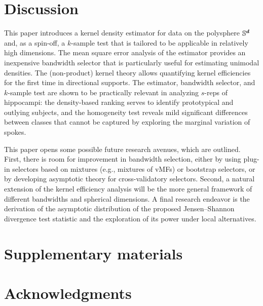 \documentclass[oneside,11pt]{article}
\begin{document}
\section{Discussion}
\label{sec:dis}

%
This paper introduces a kernel density estimator for data on the polysphere $\mathbb{S}^{\boldsymbol{d}}$ and, as a spin-off, a $k$-sample test that is tailored to be applicable in relatively high dimensions. The mean square error analysis of the estimator provides an inexpensive bandwidth selector that is particularly useful for estimating unimodal densities. The (non-product) kernel theory allows quantifying kernel efficiencies for the first time in directional supports. The estimator, bandwidth selector, and $k$-sample test are shown to be practically relevant in analyzing $s$-reps of hippocampi: the density-based ranking serves to identify prototypical and outlying subjects, and the homogeneity test reveals mild significant differences between classes that cannot be captured by exploring the marginal variation of spokes.

%
This paper opens some possible future research avenues, which are outlined. First, there is room for improvement in bandwidth selection, either by using plug-in selectors based on mixtures (e.g., mixtures of vMFs) or bootstrap selectors, or by developing asymptotic theory for cross-validatory selectors. Second, a natural extension of the kernel efficiency analysis will be the more general framework of different bandwidths and spherical dimensions. A final research endeavor is the derivation of the asymptotic distribution of the proposed Jensen--Shannon divergence test statistic and the exploration of its power under local alternatives.

\section*{Supplementary materials}

\section*{Acknowledgments}
\end{document}
